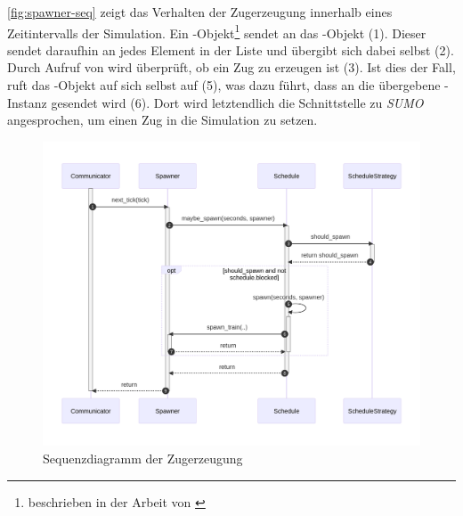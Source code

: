 \autoref{fig:spawner-seq} zeigt das Verhalten der Zugerzeugung innerhalb eines Zeitintervalls der Simulation. Ein -Objekt\footnote{beschrieben in der Arbeit von \citeauthor{kamp_architektur_2023}\cite{kamp_architektur_2023}} sendet  an das -Objekt (1). Dieser sendet daraufhin  an jedes Element in der Liste  und übergibt sich dabei selbst (2). Durch Aufruf von  wird überprüft, ob ein Zug zu erzeugen ist (3). Ist dies der Fall, ruft das -Objekt auf sich selbst  auf (5), was dazu führt, dass  an die übergebene -Instanz gesendet wird (6). Dort wird letztendlich die Schnittstelle zu \emph{SUMO} angesprochen, um einen Zug in die Simulation zu setzen.

\begin{figure}[!ht]
	\centering
	\includegraphics[width=1.0\linewidth]{images/diagrams/spawner-seq.png}
	\caption{Sequenzdiagramm der Zugerzeugung}
	\label{fig:spawner-seq}
\end{figure}

